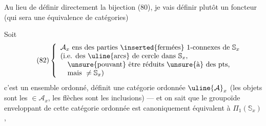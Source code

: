 

Au lieu de définir directement la bijection (80), je vais définir plutôt un foncteur (qui sera une équivalence de catégories)

Soit 
\[
\tag{82}
\left\{
\begin{array}{l}
\mathcal A_x\text{ ens des parties }\inserted{\text{fermées}}\text{ }1\text{-connexes de }\mathbb S_x\\
(\text{i.e. des }\uline{\text{arcs}}\text{ de cercle dans }\mathbb S_x,\\
\quad\unsure{\text{pouvant}}\text{ être réduits }\unsure{\text{à}}\text{ des pts,}\\
\quad\text{mais }\ne\mathbb S_x)
\end{array}
\right.
\]
c'est un ensemble ordonné,   définit une catégorie ordonnée $\uline{\mathcal A}_x$ (les objets sont les $\in\mathcal A_x$, les flèches sont les inclusions) --- et on sait que le groupoïde enveloppant  de cette catégorie ordonnée est canoniquement équivalent à $\Pi_1(\mathbb S_x)$,




